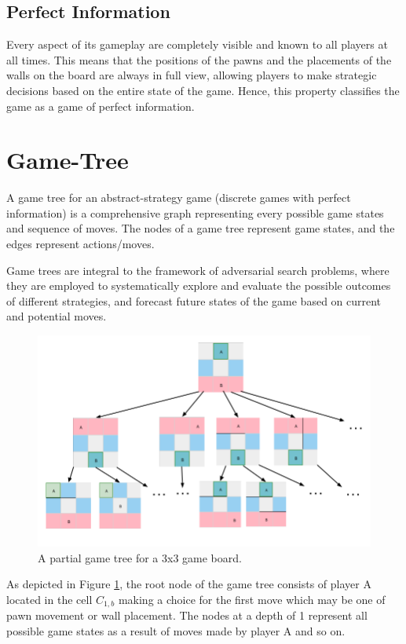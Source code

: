 \subsection{Perfect Information}
Every aspect of its gameplay are completely visible and known to all players at all times. This means that the positions of the pawns and the placements of the walls on the board are always in full view, allowing players to make strategic decisions based on the entire state of the game. Hence, this property classifies the game as a game of perfect information.

\section{Game-Tree}

A game tree for an abstract-strategy game (discrete games with perfect information) is a comprehensive graph representing every possible game states and sequence of moves. The nodes of a game tree represent game states, and the edges represent actions/moves.

Game trees are integral to the framework of adversarial search problems, where they are employed to systematically explore and evaluate the possible outcomes of different strategies, and forecast future states of the game based on current and potential moves.

\begin{figure}[!ht]
    \centering
    \includegraphics[scale=0.45]{../img/GameBoard/game_tree.png}
    \caption{A partial game tree for a 3x3 game board.}
    \label{fig:GameTree}
\end{figure}

As depicted in Figure \ref{fig:GameTree}, the root node of the game tree consists of player A located in the cell $C_{1, b}$ making a choice for the first move which may be one of pawn movement or wall placement. The nodes at a depth of 1 represent all possible game states as a result of moves made by player A and so on.


